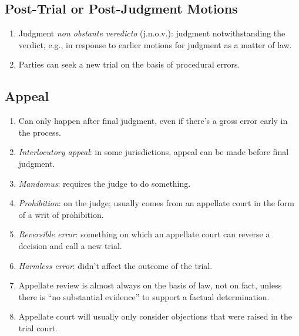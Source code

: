 \subsection{Post-Trial or Post-Judgment Motions}

\begin{enumerate}
    \item Judgment \emph{non obstante veredicto} (j.n.o.v.): judgment 
    notwithstanding the verdict, e.g., in response to earlier motions for 
    judgment as a matter of law.
    \item Parties can seek a new trial on the basis of procedural errors.
\end{enumerate}

\subsection{Appeal}

\begin{enumerate}
    \item Can only happen after final judgment, even if there's a gross error 
    early in the process.
    \item \emph{Interlocutory appeal}: in some jurisdictions, appeal can be 
    made before final judgment.
    \item \emph{Mandamus}: requires the judge to do something.
    \item \emph{Prohibition}: on the judge; usually comes from an appellate 
    court in the form of a writ of prohibition.
    \item \emph{Reversible error}: something on which an appellate court can 
    reverse a decision and call a new trial.
    \item \emph{Harmless error}: didn't affect the outcome of the trial.
    \item Appellate review is almost always on the basis of law, not on fact, 
    unless there is ``no substantial evidence'' to support a factual 
    determination.
    \item Appellate court will usually only consider objections that were 
    raised in the trial court.
\end{enumerate}
